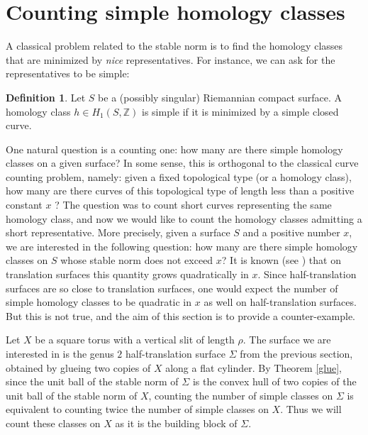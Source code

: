 \documentclass{article}
\newcommand{\ZZ}{\mathbb{Z}}
\theoremstyle{definition}
\newtheorem{definition}[thm]{Definition}
\begin{document}
\section{Counting simple homology classes}




A classical problem related to the stable norm is to find the homology classes that are minimized by \emph{nice} representatives. For instance, we can ask for the representatives to be simple:

\begin{definition}
    Let $S$ be a (possibly singular) Riemannian compact surface. A homology class $h\in H_1(S,\ZZ)$ is simple if it is minimized by a simple closed curve.
\end{definition}

One natural question is a counting one: how many are there simple homology classes on a given surface? In some sense, this is orthogonal to the classical curve counting problem, namely: given a fixed topological type (or a homology class), how many are there curves of this topological type of length less than a positive constant $x$ ? The question was to count short curves representing the same homology class, and now we would like to count the homology classes admitting a short representative. \newline 
More precisely, given a surface $S$ and a positive number $x$, we are interested in the following question: how many are there simple homology classes on $S$ whose stable norm does not exceed $x$?
It is known (see \cite{Gut-Mas}) that on translation surfaces this quantity grows quadratically in $x$. Since half-translation surfaces are so close to translation surfaces, one would expect the number of simple homology classes to be quadratic in $x$ as well on half-translation surfaces. But this is not true, and the aim of this section is to provide a counter-example. \newline \newline

Let $X$ be a square torus with a vertical slit of length $\rho$.
The surface we are interested in is the genus $2$ half-translation surface $\Sigma$ from the previous section, obtained by glueing two copies of $X$ along a flat cylinder. By Theorem \ref{glue}, since the unit ball of the stable norm of $\Sigma$ is the convex hull of two copies of the unit ball of the stable norm of $X$, counting the number of simple classes on $\Sigma$ is equivalent to counting twice the number of simple classes on $X$. Thus we will count these classes on $X$ as it is the building block of $\Sigma$. 
\end{document}
